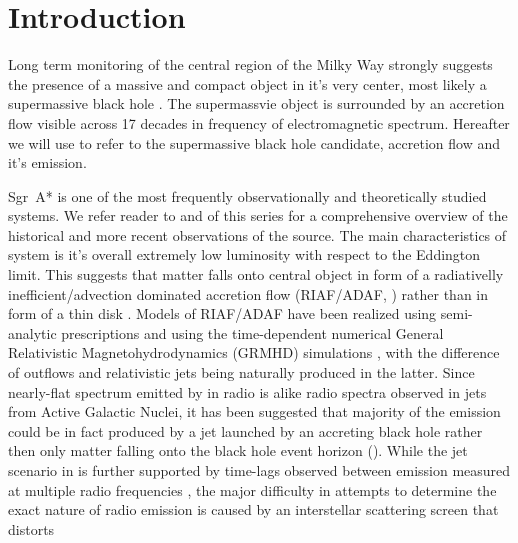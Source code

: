 \section{Introduction}\label{sec:intro}


Long term monitoring of the central region of the Milky Way strongly suggests the presence of a massive and compact object in it's very center, most likely a supermassive black hole \citep{2019Sci...365..664D,2019A&A...625L..10G}. The supermassvie object is surrounded by an accretion flow visible across 17 decades in frequency of electromagnetic spectrum. Hereafter we will use \sgra to refer to the supermassive black hole candidate, accretion flow and it's emission.

Sgr~A* is one of the most frequently observationally and theoretically studied systems.  We refer reader to  and  of this series for a comprehensive overview of the historical and more recent observations of the source. The main characteristics of \sgra system is it's overall extremely low luminosity with respect to the Eddington limit. This suggests that matter falls onto \sgra central object in form of a radiativelly inefficient/advection dominated accretion flow (RIAF/ADAF, \citealt{1977ApJ...214..840I,1994ApJ...428L..13N, 1995ApJ...444..231N,
  1995ApJ...452..710N, 1996A&AS..120C.287N, 1998ApJ...492..554N,2014ARA&A..52..529Y}) rather than in form of a thin disk \citep{1973A&A....24..337S}. Models of RIAF/ADAF have been realized using semi-analytic prescriptions \citep[e.g.,][]{1995Natur.374..623N,2000ApJ...541..234O, 2009ApJ...697...45B,2011ApJ...735..110B,2018ApJ...863..148P} and using the time-dependent numerical General Relativistic Magnetohydrodynamics (GRMHD) simulations \citep[e.g.,][]{2000ApJ...528..462H, 2003ApJ...589..458D,
  2003ApJ...589..444G, 2007CQGra..24S.235G, 2012ApJS..201....9F,
  2014ApJ...796...22F, 2016ApJS..225...22W, 2017ApJS..231...17A,
  2018JPhCS1031a2008O, 2019A&A...629A..61O, 2019ApJS..243...26P}, with the difference of outflows and
relativistic jets being naturally produced in the latter. Since nearly-flat spectrum emitted by \sgra in radio is alike radio spectra observed in jets from Active Galactic Nuclei, it has been suggested that majority of the \sgra emission could be in fact produced by a jet launched by an accreting black hole rather then only matter falling onto the black hole event horizon (\citealt{2000A&A...362..113F,2004A&A...414..895F, 2005ApJ...635.1203M, 2013A&A...559L...3M}).  While the jet scenario in \sgra is further supported by time-lags observed between emission measured at multiple radio frequencies \citep{2015A&A...576A..41B,2021arXiv210713402B}, the major difficulty in attempts to determine the exact nature of \sgra radio emission is caused by an interstellar scattering screen that distorts
